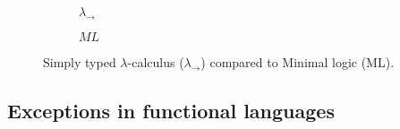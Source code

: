 \begin{figure}[htp]
\centering
\begin{subfigure}[b]{0.45\textwidth}
\begin{minipage}{0.3\textwidth}\begin{prooftree}
\end{prooftree}\end{minipage}
%
\begin{minipage}{0.3\textwidth}\begin{prooftree}
\end{prooftree}\end{minipage}
%
\begin{minipage}{0.3\textwidth}\begin{prooftree}
\end{prooftree}\end{minipage}
\caption{$\lambda_\to$}
\end{subfigure}
%
\begin{subfigure}[b]{0.45\textwidth}
\begin{minipage}{0.3\textwidth}\begin{prooftree}
\end{prooftree}\end{minipage}
%
\begin{minipage}{0.3\textwidth}\begin{prooftree}
\end{prooftree}\end{minipage}
%
\begin{minipage}{0.3\textwidth}\begin{prooftree}
\end{prooftree}\end{minipage}
\caption{$ML$}
\end{subfigure}

\caption{Simply typed $\lambda$-calculus ($\lambda_\to$) compared to Minimal logic (ML).}
\label{fig:stlc-ml}
\end{figure}

\subsection{Exceptions in functional languages}

